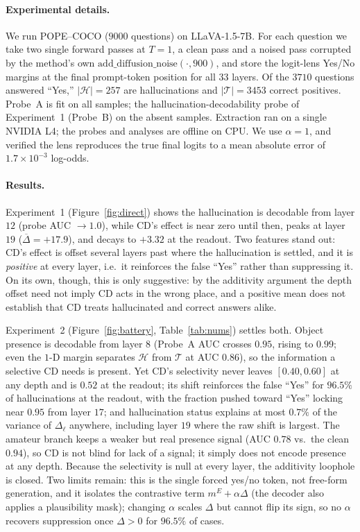 \documentclass[11pt]{article}
\begin{document}
\paragraph{Experimental details.}
We run POPE--COCO ($9000$ questions) on LLaVA-1.5-7B. For each question we take two
single forward passes at $T=1$, a clean pass and a noised pass corrupted by the
method's own $\mathrm{add\_diffusion\_noise}(\cdot,900)$, and store the logit-lens
Yes/No margins at the final prompt-token position for all $33$ layers. Of the $3710$
questions answered ``Yes,'' $|\mathcal{H}|=257$ are hallucinations and
$|\mathcal{T}|=3453$ correct positives. Probe~A is fit on all samples; the
hallucination-decodability probe of Experiment~1 (Probe~B) on the absent samples.
Extraction ran on a single NVIDIA L4; the probes and analyses are offline on CPU. We
use $\alpha=1$, and verified the lens reproduces the true final logits to a mean
absolute error of $1.7\times10^{-3}$ log-odds.

\paragraph{Results.}
Experiment~1 (Figure~\ref{fig:direct}) shows the hallucination is decodable from
layer $12$ (probe AUC $\to 1.0$), while CD's effect is near zero until then, peaks at
layer $19$ ($\overline{\Delta}=+17.9$), and decays to $+3.32$ at the readout. Two
features stand out: CD's effect is offset several layers past where the hallucination
is settled, and it is \emph{positive} at every layer, i.e.\ it reinforces the false
``Yes'' rather than suppressing it. On its own, though, this is only suggestive: by
the additivity argument the depth offset need not imply CD acts in the wrong place,
and a positive mean does not establish that CD treats hallucinated and correct
answers alike.

Experiment~2 (Figure~\ref{fig:battery}, Table~\ref{tab:nums}) settles both. Object
presence is decodable from layer $8$ (Probe~A AUC crosses $0.95$, rising to $0.99$;
even the $1$-D margin separates $\mathcal{H}$ from $\mathcal{T}$ at AUC $0.86$), so
the information a selective CD needs is present. Yet CD's selectivity never leaves
$[0.40,0.60]$ at any depth and is $0.52$ at the readout; its shift reinforces the
false ``Yes'' for $96.5\%$ of hallucinations at the readout, with the fraction pushed
toward ``Yes'' locking near $0.95$ from layer $17$; and hallucination status explains
at most $0.7\%$ of the variance of $\Delta_\ell$ anywhere, including layer $19$ where
the raw shift is largest. The amateur branch keeps a weaker but real presence signal
(AUC $0.78$ vs.\ the clean $0.94$), so CD is not blind for lack of a signal; it simply
does not encode presence at any depth. Because the selectivity is null at every
layer, the additivity loophole is closed. Two limits remain: this is the single
forced yes/no token, not free-form generation, and it isolates the contrastive term
$m^{E}+\alpha\Delta$ (the decoder also applies a plausibility mask); changing $\alpha$
scales $\Delta$ but cannot flip its sign, so no $\alpha$ recovers suppression once
$\Delta>0$ for $96.5\%$ of cases.
\end{document}
